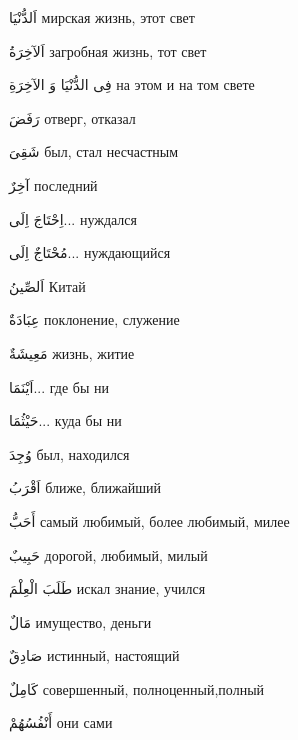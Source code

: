 \documentclass[a5paper]{article}
\newcommand\textstyleDropCaps[1]{#1}
\newcommand\textstyleCaptioncharacters[1]{#1}
\begin{document}
\textstyleCaptioncharacters{اَلدُّنْيَا }\textstyleDropCaps{мирская жизнь, этот свет‎}

\textstyleCaptioncharacters{اَلآخِرَةُ }\textstyleDropCaps{загробная жизнь, тот свет‎}

\textstyleCaptioncharacters{فِى الدُّنْيَا وَ الآخِرَةِ }\textstyleDropCaps{на этом и на том свете‎}

\textstyleCaptioncharacters{رَفَضَ }\textstyleDropCaps{отверг, отказал‎}

\textstyleCaptioncharacters{شَقِىَ }\textstyleDropCaps{был, стал несчаст­ным‎}

\textstyleCaptioncharacters{آخِرٌ }\textstyleDropCaps{последний‎}

\textstyleCaptioncharacters{اِحْتَاجَ اِلَى... }\textstyleDropCaps{нуждался‎}

\textstyleCaptioncharacters{مُحْتَاجٌ اِلَى... }\textstyleDropCaps{нуждаю­щийся‎}

\textstyleCaptioncharacters{اَلصِّينُ }\textstyleDropCaps{Китай‎}

\textstyleCaptioncharacters{عِبَادَةٌ }\textstyleDropCaps{поклонение, служе­ние‎}

\textstyleCaptioncharacters{مَعِيشَةٌ }\textstyleDropCaps{жизнь, житие‎}

\textstyleCaptioncharacters{اَيْنَمَا... }\textstyleDropCaps{где бы ни‎}

\textstyleCaptioncharacters{حَيْثُمَا... }\textstyleDropCaps{куда бы ни‎}

\textstyleCaptioncharacters{وُجِدَ }\textstyleDropCaps{был, находился‎}

\textstyleCaptioncharacters{اَقْرَبُ }\textstyleDropCaps{ближе, ближайший‎}

\textstyleCaptioncharacters{أَحَبُّ }\textstyleDropCaps{самый любимый, бо­лее любимый, милее‎}

\textstyleCaptioncharacters{حَبِيبٌ }\textstyleDropCaps{дорогой, люби­мый, милый‎}

\textstyleCaptioncharacters{طَلَبَ الْعِلْمَ }\textstyleDropCaps{искал зна­ние, учился‎}

\textstyleCaptioncharacters{مَالٌ }\textstyleDropCaps{имущество, деньги‎}

\textstyleCaptioncharacters{صَادِقٌ }\textstyleDropCaps{истинный, настоя­щий‎}

\textstyleCaptioncharacters{كَامِلٌ }\textstyleDropCaps{совершенный, пол­ноценный,полный‎}

\textstyleCaptioncharacters{أَنْفُسُهُمْ }\textstyleDropCaps{они сами‎}
\end{document}
